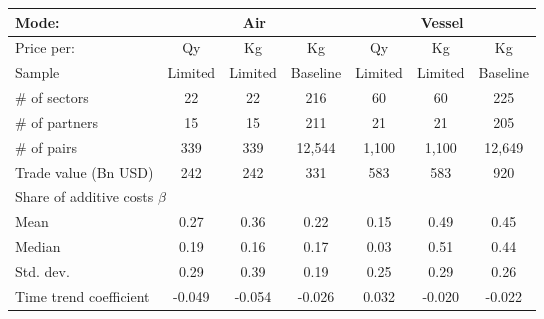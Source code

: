 \begin{tabular}{l|ccc|ccc}
\cline{1-7}
Mode: &
  \multicolumn{3}{|c}{Air} &
  \multicolumn{3}{|c}{Vessel} \\ \hline
Price per: & Qy & Kg & Kg & Qy &  Kg & Kg\\ \cline{1-7}
Sample & Limited &Limited  & Baseline & Limited  & Limited & Baseline \\
\hspace{1em}$\#$ of sectors &
22 &22 &216 &60 &60 &225 \\
\hspace{1em}$\#$ of partners &
15 &15 &211 &21 &21 &205 \\
\hspace{1em}$\#$ of pairs &
339 &339 &12,544 &1,100 &1,100 &12,649 \\
\hspace{1em}Trade value (Bn USD)&
242 &
242 &
331 &
583 &
583 &
920 \\ \hline
\multicolumn{7}{l}{Share of additive costs $\beta$} \\ \hline
\hspace{1em} Mean &
0.27 &0.36 &0.22 &0.15 &0.49 &0.45 \\
\hspace{1em} Median &
0.19 &0.16 &0.17 &0.03 &0.51 & 0.44 \\
\hspace{1em} Std. dev. &
0.29 &0.39 &0.19 &0.25 &0.29 &0.26 \\
\hspace{1em} Time trend  coefficient &
-0.049 &-0.054 &-0.026 &0.032 &-0.020 &-0.022 \\ \cline{1-7}
\end{tabular}
